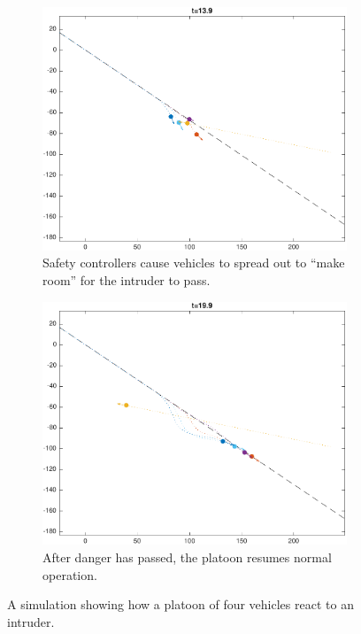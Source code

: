 \begin{figure}
    \begin{subfigure}[t]{0.45\textwidth} \label{subfig:in_140}
        \includegraphics[width=\textwidth]{fig/in_140}
        \caption{Safety controllers cause vehicles to spread out to ``make room'' for the intruder to pass.}
    \end{subfigure}
    \begin{subfigure}[t]{0.45\textwidth} \label{subfig:in_200}
        \includegraphics[width=\textwidth]{fig/in_200}
        \caption{After danger has passed, the platoon resumes normal operation.}
    \end{subfigure}   
    \caption{A simulation showing how a platoon of four vehicles react to an intruder. \label{fig:in}}
\end{figure}

